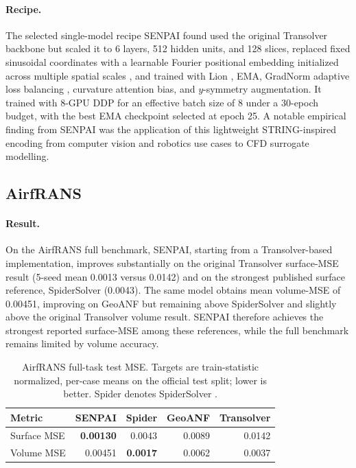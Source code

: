\documentclass{article}
\newcommand{\best}[1]{\textbf{#1}}
\begin{document}
\paragraph{Recipe.}
The selected single-model recipe SENPAI found used the original Transolver backbone but scaled it to 6 layers, 512 hidden units, and 128 slices, replaced fixed sinusoidal coordinates with a learnable Fourier positional embedding initialized across multiple spatial scales \citep{li2021learnable,schenck2025learningropes}, and trained with Lion \citep{chen2023symbolic}, EMA, GradNorm adaptive loss balancing \citep{chen2018gradnorm}, curvature attention bias, and $y$-symmetry augmentation. It trained with 8-GPU DDP for an effective batch size of 8 under a 30-epoch budget, with the best EMA checkpoint selected at epoch 25. A notable empirical finding from SENPAI was the application of this lightweight STRING-inspired encoding from computer vision and robotics use cases to CFD surrogate modelling.

\subsection{AirfRANS}

\paragraph{Result.}
On the AirfRANS full benchmark, SENPAI, starting from a Transolver-based implementation, improves substantially on the original Transolver surface-MSE result (5-seed mean 0.0013 versus 0.0142) and on the strongest published surface reference, SpiderSolver (0.0043). The same model obtains mean volume-MSE of 0.00451, improving on GeoANF \citep{li2024geoanf} but remaining above SpiderSolver and slightly above the original Transolver volume result. SENPAI therefore achieves the strongest reported surface-MSE among these references, while the full benchmark remains limited by volume accuracy.

\begin{table}[t]
  \caption{AirfRANS full-task test MSE. Targets are train-statistic normalized, per-case means on the official test split; lower is better. Spider denotes SpiderSolver \citep{qi2025spidersolver}.}
  \label{tab:airfrans}
  \centering
  \small
  \setlength{\tabcolsep}{2.5pt}
  \begin{tabular}{@{}lrrrr@{}}
    \toprule
    Metric & SENPAI & Spider & GeoANF & Transolver \\
    \midrule
    Surface MSE & \best{0.00130} & 0.0043 & 0.0089 & 0.0142 \\
    Volume MSE & 0.00451 & \best{0.0017} & 0.0062 & 0.0037 \\
    \bottomrule
  \end{tabular}
\end{table}
\end{document}
